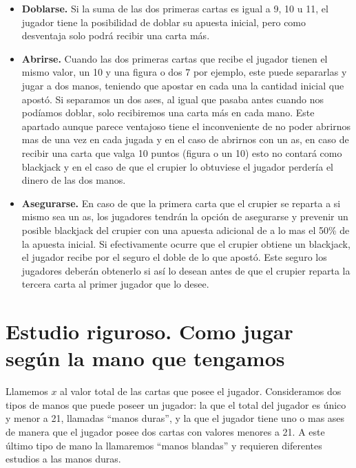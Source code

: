 \documentclass[12pt,a4paper,]{book}
\providecommand{\tightlist}{%
  \setlength{\itemsep}{0pt}\setlength{\parskip}{0pt}}
\numberwithin{dummy}{section}
\theoremstyle{ocrenumbox}
\theoremstyle{blacknumex}
\theoremstyle{blacknumbox}
\theoremstyle{ocrenum}
\theoremstyle{ocrenum}
\begin{document}
\begin{itemize}
  \begin{itemize}
  \tightlist
  \item
    \textbf{Doblarse.} Si la suma de las dos primeras cartas es igual a
    9, 10 u 11, el jugador tiene la posibilidad de doblar su apuesta
    inicial, pero como desventaja solo podrá recibir una carta más.
  \item
    \textbf{Abrirse.} Cuando las dos primeras cartas que recibe el
    jugador tienen el mismo valor, un 10 y una figura o dos 7 por
    ejemplo, este puede separarlas y jugar a dos manos, teniendo que
    apostar en cada una la cantidad inicial que apostó. Si separamos un
    dos ases, al igual que pasaba antes cuando nos podíamos doblar, solo
    recibiremos una carta más en cada mano. Este apartado aunque parece
    ventajoso tiene el inconveniente de no poder abrirnos mas de una vez
    en cada jugada y en el caso de abrirnos con un as, en caso de
    recibir una carta que valga 10 puntos (figura o un 10) esto no
    contará como blackjack y en el caso de que el crupier lo obtuviese
    el jugador perdería el dinero de las dos manos.
  \item
    \textbf{Asegurarse.} En caso de que la primera carta que el crupier
    se reparta a si mismo sea un as, los jugadores tendrán la opción de
    asegurarse y prevenir un posible blackjack del crupier con una
    apuesta adicional de a lo mas el 50\% de la apuesta inicial. Si
    efectivamente ocurre que el crupier obtiene un blackjack, el jugador
    recibe por el seguro el doble de lo que apostó. Este seguro los
    jugadores deberán obtenerlo si así lo desean antes de que el crupier
    reparta la tercera carta al primer jugador que lo desee.
  \end{itemize}
\end{itemize}

\hypertarget{Seccion32}{%
\section{Estudio riguroso. Como jugar según la mano que
tengamos}\label{Seccion32}}

Llamemos \(x\) al valor total de las cartas que posee el jugador.
Consideramos dos tipos de manos que puede poseer un jugador: la que el
total del jugador es único y menor a 21, llamadas ``manos duras'', y la
que el jugador tiene uno o mas ases de manera que el jugador posee dos
cartas con valores menores a 21. A este último tipo de mano la
llamaremos ``manos blandas'' y requieren diferentes estudios a las manos
duras.
\end{document}
